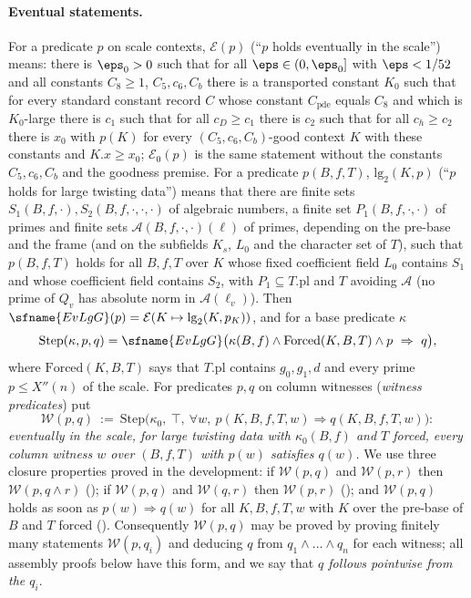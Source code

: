\paragraph{Eventual statements.} For a predicate $p$ on scale contexts, $\mathcal{E}(p)$ (``$p$ holds
eventually in the scale'') means: there is $\eps_0>0$ such that for all $\eps\in(0,\eps_0]$ with $\eps<1/52$
and all constants $C_8\ge1$, $C_5,c_6,C_b$ there is a transported constant $K_0$ such that for every standard
constant record $C$ whose constant $C_{\mathrm{pde}}$ equals $C_8$ and which is $K_0$-large there is $c_1$ such that for all
$c_D\ge c_1$ there is $c_2$ such that for all $c_h\ge c_2$ there is $x_0$ with $p(K)$ for every
$(C_5,c_6,C_b)$-good context $K$ with these constants and $K.x\ge x_0$; $\mathcal E_0(p)$ is the same
statement without the constants $C_5,c_6,C_b$ and the goodness premise. For a predicate $p(B,f,T)$,
$\mathrm{lg}_2(K,p)$ (``$p$ holds for large twisting data'') means that there are finite sets
$S_1(B,f,\cdot),S_2(B,f,\cdot,\cdot,\cdot)$ of algebraic numbers, a finite set $P_1(B,f,\cdot,\cdot)$ of primes
and finite sets $\mathcal A(B,f,\cdot,\cdot)(\ell)$ of primes, depending on the pre-base and the frame (and on
the subfields $K_s$, $L_0$ and the character set of $T$), such that $p(B,f,T)$ holds for all $B,f,T$ over $K$
whose fixed coefficient field $L_0$ contains $S_1$ and whose coefficient field contains $S_2$, with
$P_1\subseteq T.\mathrm{pl}$ and $T$ avoiding $\mathcal A$ (no prime of $Q_v$ has absolute norm in
$\mathcal A(\ell_v)$). Then $\sfname{EvLgG}(p)=\mathcal{E}(K\mapsto\mathrm{lg}_2(K,p_K))$, and for a base
predicate $\kappa$
\[
  \mathrm{Step}(\kappa,p,q)=\sfname{EvLgG}\bigl(\kappa(B,f)\wedge\mathrm{Forced}(K,B,T)\wedge p\ \Rightarrow\ q\bigr),
\]
where $\mathrm{Forced}(K,B,T)$ says that $T.\mathrm{pl}$ contains $g_0,g_1,d$ and every prime $p\le X''(n)$
of the scale. For predicates $p,q$ on column witnesses (\emph{witness predicates}) put
\begin{equation}\label{eq:pf:baselat2:stepw}
  \mathcal{W}(p,q)\ :=\ \mathrm{Step}\bigl(\kappa_0,\ \top,\ \forall w,\ p(K,B,f,T,w)\Rightarrow q(K,B,f,T,w)\bigr):
\end{equation}
\emph{eventually in the scale, for large twisting data with $\kappa_0(B,f)$ and $T$ forced, every
column witness $w$ over $(B,f,T)$ with $p(w)$ satisfies $q(w)$.} We use three closure properties
proved in the development: if $\mathcal{W}(p,q)$ and $\mathcal{W}(p,r)$ then $\mathcal{W}(p,q\wedge r)$
(); if $\mathcal{W}(p,q)$ and $\mathcal{W}(q,r)$ then
$\mathcal{W}(p,r)$ (); and $\mathcal{W}(p,q)$ holds as
soon as $p(w)\Rightarrow q(w)$ for all $K,B,f,T,w$ with $K$ over the pre-base of $B$ and $T$ forced
(). Consequently $\mathcal{W}(p,q)$ may be proved by
proving finitely many statements $\mathcal{W}(p,q_i)$ and deducing $q$ from $q_1\wedge\dots\wedge q_n$ for
each witness; all assembly proofs below have this form, and we say that \emph{$q$ follows pointwise from
the $q_i$}.

